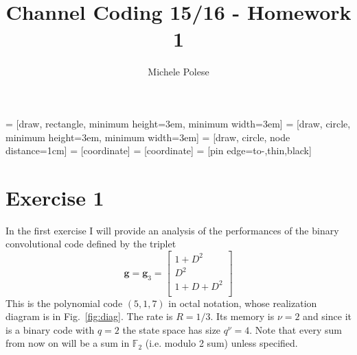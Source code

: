 \documentclass[10pt]{article}
\begin{document}
\title{Channel Coding 15/16 - Homework 1}
\author{Michele Polese}

\maketitle

 = [draw, rectangle, 
    minimum height=3em, minimum width=3em]
 = [draw, circle, minimum height=3em, minimum width=3em]
 = [draw, circle, node distance=1cm]
 = [coordinate]
 = [coordinate]
 = [pin edge={to-,thin,black}]


\section*{Exercise 1}
In the first exercise I will provide an analysis of the performances of the binary convolutional code defined by the triplet 
\begin{equation}
	\mathbf{g} = \mathbf{g}_3 = \begin{bmatrix}
			1 + D^2 \\
			D^2	\\
			1 + D + D^2 \\
			\end{bmatrix}
\end{equation}
This is the polynomial code $(5,1,7)$ in octal notation, whose realization diagram is in Fig.~\ref{fig:diag}. The rate is $R = 1/3$. Its memory is $\nu = 2$ and since it is a binary code with $q = 2$ the state space has size $q^\nu = 4$. Note that every sum from now on will be a sum in $\mathbb{F}_2$ (i.e. modulo 2 sum) unless specified.
\end{document}
